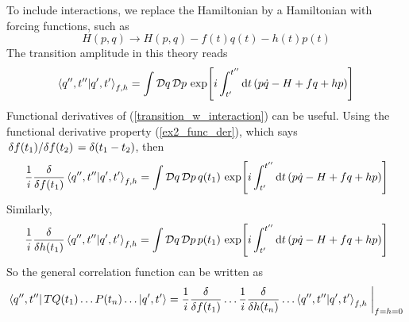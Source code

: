 To include interactions, we replace  the Hamiltonian by a Hamiltonian with forcing functions, such as
\begin{equation}
    H(p,q)\to H(p,q)-f(t)q(t)-h(t)p(t)
\end{equation}
The transition amplitude in this theory reads
\begin{equation}
     \braket{q^{\prime\prime},t^{\prime\prime}}{q^{\prime},t^{\prime}}_{f,h}=\int\mathcal{D}q\,\mathcal{D}p\,\exp[i\int_{t^\prime}^{t^{\prime\prime}}\dd t\, (p\dot{q}-H+fq+hp)]
     \label{transition_w_interaction}
\end{equation}
Functional derivatives of (\ref{transition_w_interaction}) can be useful. Using the functional derivative property (\ref{ex2_func_der}), which says $\fdv*{f(t_1)}{f(t_2)}=\delta(t_1-t_2)$,  then
\begin{equation}
    \frac{1}{i}\fdv{f(t_1)}\braket{q^{\prime\prime},t^{\prime\prime}}{q^{\prime},t^{\prime}}_{f,h}=\int\mathcal{D}q\,\mathcal{D}p\,q(t_1)\,\exp[i\int_{t^\prime}^{t^{\prime\prime}}\dd t\, (p\dot{q}-H+fq+hp)]
\end{equation}
Similarly,
\begin{equation}
    \frac{1}{i}\fdv{h(t_1)}\braket{q^{\prime\prime},t^{\prime\prime}}{q^{\prime},t^{\prime}}_{f,h}=\int\mathcal{D}q\,\mathcal{D}p\,p(t_1)\,\exp[i\int_{t^\prime}^{t^{\prime\prime}}\dd t\, (p\dot{q}-H+fq+hp)]
\end{equation}
So the general correlation function can be written as
\begin{equation}
    \bra{q^{\prime\prime},t^{\prime\prime}}TQ(t_1)\dots P(t_n)\dots\ket{q^\prime,t^\prime}=\frac{1}{i}\fdv{f(t_1)}\dots\frac{1}{i}\fdv{h(t_n)}\dots\braket{q^{\prime\prime},t^{\prime\prime}}{q^\prime,t^\prime}_{f,h}\eval_{f=h=0}
\end{equation}
